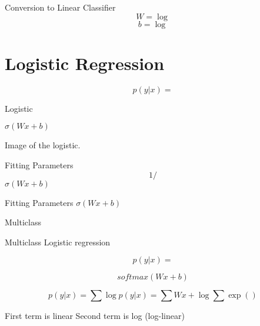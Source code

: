 \documentclass{beamer}
\begin{document}
\begin{frame}{Conversion to Linear Classifier}
  \[ W = \log \] 
  \[ b =  \log \] 
\end{frame}

\section{Logistic Regression}

\begin{frame}
  \[ p(y | x) =  \] 

  Logistic 

  $\sigma(W x + b)$

  Image of the logistic.  
\end{frame}

\begin{frame}{Fitting Parameters}
  \[ 1 / \]  
  $\sigma(W x + b)$
\end{frame}



\begin{frame}{Fitting Parameters}
  $\sigma(W x + b)$
\end{frame}


\begin{frame}{Multiclass}

Multiclass Logistic regression

\[ p(y | x) =  \] 

\[ softmax(W x+ b) \] 
\end{frame}

\begin{frame}{}

  
  \[ p(y | x) = \sum \log p(y| x) = \sum W x + \log \sum \exp()   \] 

  First term is linear
  Second term is log (log-linear)
\end{frame}


\begin{frame}{}
  
\end{frame}
\end{document}
